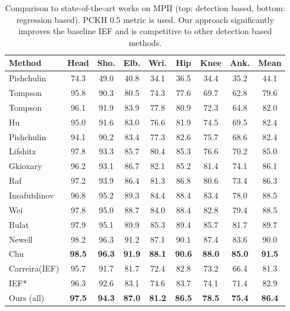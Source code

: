\documentclass[10pt,twocolumn,letterpaper]{article}
\begin{document}
\begin{table}
\centering
\footnotesize
\addtolength{\tabcolsep}{-2.5pt}
\begin{tabular}{l|c|c|c|c|c|c|c|c}
\hline
Method & Head & Sho. & Elb. &Wri. &Hip&Knee&Ank.&Mean\\
\hline \hline
Pishchulin \cite{pishchulin2013strong}&74.3 &49.0 &40.8 &34.1 &36.5 &34.4 &35.2 &44.1\\
Tompson\cite{tompson2014joint}		  &95.8 &90.3 &80.5 &74.3 &77.6 &69.7 &62.8 &79.6\\
Tompson\cite{tompson2015efficient}	  &96.1 &91.9 &83.9 &77.8 &80.9 &72.3 &64.8 &82.0\\
Hu\cite{hu2016bottom}				  &95.0 &91.6 &83.0 &76.6 &81.9 &74.5 &69.5 &82.4\\
Pishchulin\cite{pishchulin2016deepcut}&94.1 &90.2 &83.4 &77.3 &82.6 &75.7 &68.6 &82.4\\
Lifshitz\cite{lifshitz2016human}	  &97.8 &93.3 &85.7 &80.4 &85.3 &76.6 &70.2 &85.0\\
Gkioxary\cite{gkioxari2016chained}	  &96.2 &93.1 &86.7 &82.1 &85.2 &81.4 &74.1 &86.1\\
Raf\cite{rafi2016efficient}			  &97.2 &93.9 &86.4 &81.3 &86.8 &80.6 &73.4 &86.3\\
Insafutdinov\cite{insafutdinov2016deepercut} &96.8 &95.2 &89.3 &84.4 &88.4 &83.4 &78.0 &88.5\\
Wei\cite{wei2016convolutional}		  &97.8 &95.0 &88.7 &84.0 &88.4 &82.8 &79.4 &88.5\\
Bulat\cite{bulat2016human}			  &97.9 &95.1 &89.9 &85.3 &89.4 &85.7 &81.7 &89.7\\
Newell\cite{newell2016stacked}		  &98.2 &96.3 &91.2 &87.1 &90.1 &87.4 &83.6 &90.0\\
Chu\cite{chu2017multi}				  &\textbf{98.5} &\textbf{96.3} &\textbf{91.9} &\textbf{88.1} &\textbf{90.6} &\textbf{88.0} &\textbf{85.0} &\textbf{91.5}\\
\hline \hline
Carreira(IEF)\cite{carreira2016human} &95.7 &91.7 &81.7 &72.4 &82.8 &73.2 &66.4 &81.3\\
IEF*					  		 	  &96.3 &92.6 &83.1 &74.6 &83.7 &74.1 &71.4 &82.9\\
Ours (all) 							  &\textbf{97.5} &\textbf{94.3} &\textbf{87.0} &\textbf{81.2} &\textbf{86.5} &\textbf{78.5} &\textbf{75.4} &\textbf{86.4}\\
\end{tabular}
\addtolength{\tabcolsep}{2.5pt}
\caption{Comparison to state-of-the-art works on MPII (top: detection based, bottom: regression based). PCKH 0.5 metric is used. Our approach significantly improves the baseline IEF and is competitive to other detection based methods.}
\label{table:mpii_comparison}
\end{table}
\end{document}
